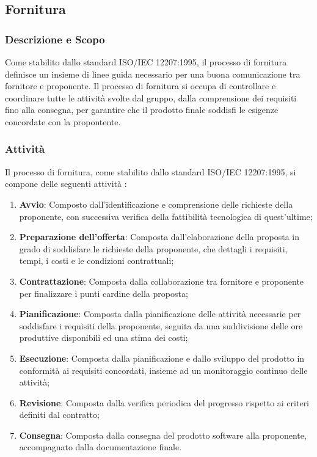 \subsection{Fornitura}

\subsubsection{Descrizione e Scopo}
Come stabilito dallo standard ISO/IEC 12207:1995, il processo di fornitura definisce un insieme di linee guida necessario per una buona comunicazione tra fornitore e proponente. Il processo di fornitura si occupa di controllare e coordinare tutte le attività svolte dal gruppo, dalla comprensione dei requisiti fino alla consegna, per garantire che il prodotto finale soddisfi le esigenze concordate con la propontente.\\

\subsubsection{Attività}
Il processo di fornitura, come stabilito dallo standard ISO/IEC 12207:1995, si compone delle seguenti attività :
\begin{enumerate}
    \item \textbf{Avvio}: Composto dall'identificazione e comprensione delle richieste della proponente, con successiva verifica della fattibilità tecnologica di quest'ultime;
    \item \textbf{Preparazione dell'offerta}: Composta dall'elaborazione della proposta in grado di soddisfare le richieste della proponente, che dettagli i requisiti, tempi, i costi e le condizioni contrattuali;
    \item \textbf{Contrattazione}: Composta dalla collaborazione tra fornitore e proponente per finalizzare i punti cardine della proposta;
    \item \textbf{Pianificazione}: Composta dalla pianificazione delle attività necessarie per soddisfare i requisiti della proponente, seguita da una suddivisione delle ore produttive disponibili ed una stima dei costi;
    \item \textbf{Esecuzione}: Composta dalla pianificazione e dallo sviluppo del prodotto in conformità ai requisiti concordati, insieme ad un monitoraggio continuo delle attività;
    \item \textbf{Revisione}: Composta dalla verifica periodica del progresso rispetto ai criteri definiti dal contratto;
    \item \textbf{Consegna}: Composta dalla consegna del prodotto software alla proponente, accompagnato dalla documentazione finale.
\end{enumerate}

